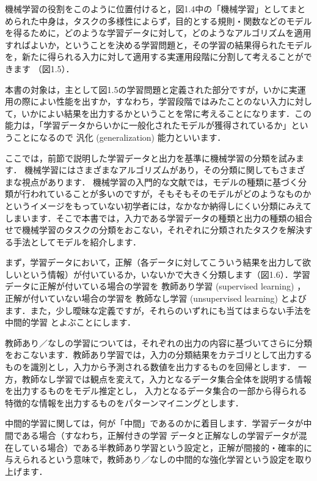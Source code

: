 機械学習の役割をこのように位置付けると，図1.4中の「機械学習」としてまとめられた中身は，タスクの多様性によらず，目的とする規則・関数などのモデルを得るために，どのような学習データに対して，どのようなアルゴリズムを適用すればよいか，ということを決める学習問題と，その学習の結果得られたモデルを，新たに得られる入力に対して適用する実運用段階に分割して考えることができます
（図1.5）．

本書の対象は，主として図1.5の学習問題と定義された部分ですが，いかに実運用の際によい性能を出すか，すなわち，学習段階ではみたことのない入力に対して，いかによい結果を出力するかということを常に考えることになります．この能力は，「学習データからいかに一般化されたモデルが獲得されているか」ということになるので
汎化 (generalization) 
能力といいます．


ここでは，前節で説明した学習データと出力を基準に機械学習の分類を試みます．
機械学習にはさまざまなアルゴリズムがあり，その分類に関してもさまざまな視点があります．
機械学習の入門的な文献では，モデルの種類に基づく分類が行われていることが多いのですが，そもそもそのモデルがどのようなものかというイメージをもっていない初学者には，なかなか納得しにくい分類にみえてしまいます．そこで本書では，入力である学習データの種類と出力の種類の組合せで機械学習のタスクの分類をおこない，それぞれに分類されたタスクを解決する手法としてモデルを紹介します．

まず，学習データにおいて，正解（各データに対してこういう結果を出力して欲しいという情報）が付いているか，いないかで大きく分類します（図1.6）．学習データに正解が付いている場合の学習を
教師あり学習  (supervised learning) 
，正解が付いていない場合の学習を
教師なし学習  (unsupervised learning)
とよびます．また，少し曖昧な定義ですが，それらのいずれにも当てはまらない手法を
中間的学習 
とよぶことにします．

教師あり／なしの学習については，それぞれの出力の内容に基づいてさらに分類をおこないます．教師あり学習では，入力の分類結果をカテゴリとして出力するものを識別とし，入力から予測される数値を出力するものを回帰とします．
一方，教師なし学習では観点を変えて，入力となるデータ集合全体を説明する情報を出力するものをモデル推定とし，
入力となるデータ集合の一部から得られる特徴的な情報を出力するものをパターンマイニングとします．

中間的学習に関しては，何が「中間」であるのかに着目します．学習データが中間である場合（すなわち，正解付きの学習
データと正解なしの学習データが混在している場合）である半教師あり学習という設定と，正解が間接的・確率的に与えられるという意味で，教師あり／なしの中間的な強化学習という設定を取り上げます．

